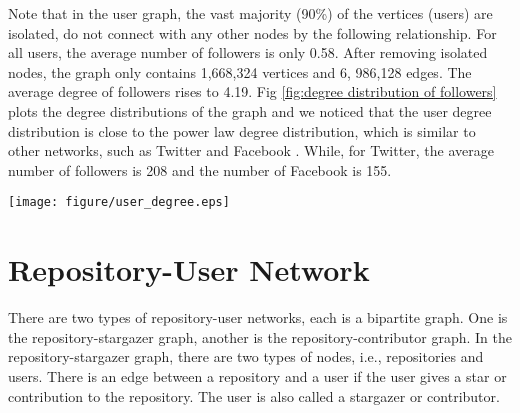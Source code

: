 \documentclass[12pt,oneside,final]{vlsithesis}
\begin{document}
Note that in the user graph, the vast majority (90\%) of the vertices (users) are isolated, do not connect with any other nodes by the following relationship.  For all users, the average number of followers is only 0.58. After removing isolated nodes, the graph only contains 1,668,324 vertices and 6, 986,128 edges. The average degree of followers rises to 4.19. Fig \ref{fig:degree distribution of followers} plots the degree distributions of the graph and we noticed that the user degree distribution is close to the power law degree distribution, which is similar to other networks, such as Twitter \cite{kwak2010twitter} and Facebook \cite{ugander2011anatomy}. While, for Twitter, the average number of followers is 208 and the number of Facebook is 155.
\begin{figure*}
	\centering
	\texttt{[image: figure/user\_degree.eps]}
	\caption{Degree distribution of followers}
	\label{fig:degree distribution of followers}
\end{figure*} 

\section{Repository-User Network}

There are two types of repository-user networks, each is a bipartite graph. One is the repository-stargazer graph, another is the repository-contributor graph. In the repository-stargazer graph, there are two types of nodes, i.e., repositories and users. There is an edge between a repository and a user if the user gives a star or contribution to the repository. The user is also called a stargazer or contributor.
\end{document}
